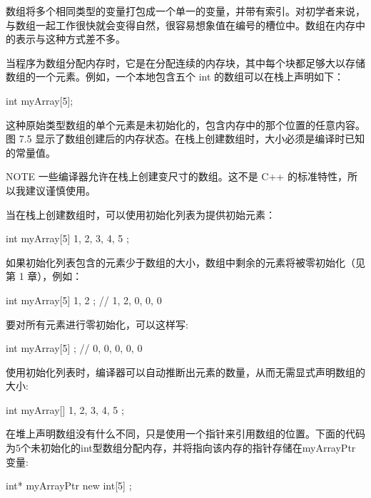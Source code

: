
数组将多个相同类型的变量打包成一个单一的变量，并带有索引。对初学者来说，与数组一起工作很快就会变得自然，很容易想象值在编号的槽位中。数组在内存中的表示与这种方式差不多。


当程序为数组分配内存时，它是在分配连续的内存块，其中每个块都足够大以存储数组的一个元素。例如，一个本地包含五个 int 的数组可以在栈上声明如下：

\begin{cpp}
int myArray[5];
\end{cpp}

这种原始类型数组的单个元素是未初始化的，包含内存中的那个位置的任意内容。图 7.5 显示了数组创建后的内存状态。在栈上创建数组时，大小必须是编译时已知的常量值。


\begin{myNotic}{NOTE}
一些编译器允许在栈上创建变尺寸的数组。这不是 C++ 的标准特性，所以我建议谨慎使用。
\end{myNotic}

当在栈上创建数组时，可以使用初始化列表为提供初始元素：

\begin{cpp}
int myArray[5] { 1, 2, 3, 4, 5 };
\end{cpp}

如果初始化列表包含的元素少于数组的大小，数组中剩余的元素将被零初始化（见第 1 章），例如：

\begin{cpp}
int myArray[5] { 1, 2 }; // 1, 2, 0, 0, 0
\end{cpp}

要对所有元素进行零初始化，可以这样写:

\begin{cpp}
int myArray[5] { }; // 0, 0, 0, 0, 0
\end{cpp}

使用初始化列表时，编译器可以自动推断出元素的数量，从而无需显式声明数组的大小:

\begin{cpp}
int myArray[] { 1, 2, 3, 4, 5 };
\end{cpp}

在堆上声明数组没有什么不同，只是使用一个指针来引用数组的位置。下面的代码为5个未初始化的int型数组分配内存，并将指向该内存的指针存储在myArrayPtr变量:

\begin{cpp}
int* myArrayPtr { new int[5] };
\end{cpp}


